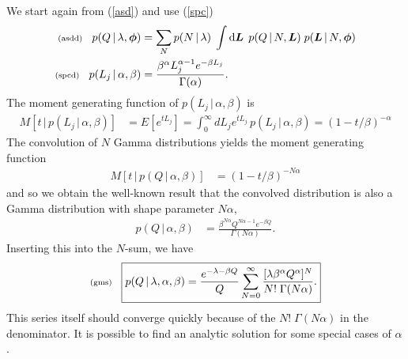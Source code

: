 \documentclass[11pt]{article}
\newcommand{\lleq}[1]{\label{#1} }
\renewcommand{\lleq}[1]{\label{#1} {\scriptstyle {\rm (#1)}} \hspace*{2ex} }
\newcommand{\cond}{\,|\,}
\newcommand{\rmdx}[1]{\dd{#1}} %
\begin{document}
We start again from (\ref{asd}) and use (\ref{spc})
\begin{align}
  \lleq{asdd}
  p(Q\cond \lambda,\bmphi)
  &= \sum_N
    p(N\cond \lambda)\;
    \int \rmdx{\bmL}\;
    p(Q\cond N,\bmL)\;
    p(\bmL\cond N,\bmphi)\\
  \lleq{spcd}
  p(L_j\cond \alpha,\beta)
  &= \frac{\beta^\alpha L_j^{\alpha-1}e^{-\beta L_j}}{\Gamma(\alpha)}.
\end{align}
The moment generating function of $p(L_j\cond \alpha,\beta)$ is
\begin{align}
  M[t\cond p(L_j\cond \alpha,\beta) ]
  &= E[e^{tL_j}] = \int_0^\infty dL_j e^{tL_j}\,p(L_j\cond \alpha,\beta)
    = (1 - t/\beta)^{-\alpha}
\end{align}
The convolution of $N$ Gamma distributions yields the moment generating
function
\begin{align}
  M[t\cond p(Q\cond \alpha,\beta) ]
  &= (1-t/\beta)^{-N\alpha}
\end{align}
and so we obtain the well-known result that the convolved distribution
is also a Gamma distribution with shape parameter $N\alpha$,
\begin{align}
  p(Q\cond \alpha,\beta)
  &= \frac{\beta^{N\alpha} Q^{N\alpha-1}e^{-\beta Q}}{\Gamma(N\alpha)}.
\end{align}
Inserting this into the $N$-sum, we have
\begin{equation}
  \lleq{gms}
  \boxed{
  p(Q\cond \lambda,\alpha,\beta)
  = \frac{e^{-\lambda - \beta Q}}{Q}
    \sum_{N=0}^\infty
    \frac{[\lambda \beta^\alpha Q^\alpha]^N}{N!\;\Gamma(N\alpha)}.
    }
\end{equation}
This series itself should converge quickly because of the
$N!\;\Gamma(N\alpha)$ in the denominator. It is possible to find an
analytic solution for some special cases of $\alpha$.
\end{document}
